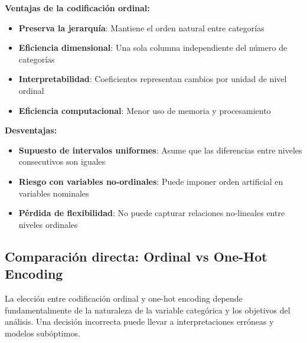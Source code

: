 \documentclass[
  letterpaper,
  DIV=11,
  numbers=noendperiod]{scrreprt}
\providecommand{\tightlist}{%
  \setlength{\itemsep}{0pt}\setlength{\parskip}{0pt}}
\begin{document}
\begin{tcolorbox}[enhanced jigsaw, breakable, toprule=.15mm, bottomtitle=1mm, coltitle=black, colbacktitle=quarto-callout-note-color!10!white, titlerule=0mm, opacitybacktitle=0.6, bottomrule=.15mm, toptitle=1mm, title=\textcolor{quarto-callout-note-color}{\faInfo}\hspace{0.5em}{Ventajas y desventajas}, arc=.35mm, rightrule=.15mm, opacityback=0, colframe=quarto-callout-note-color-frame, leftrule=.75mm, left=2mm, colback=white]

\textbf{Ventajas de la codificación ordinal:}

\begin{itemize}
\tightlist
\item
  \textbf{Preserva la jerarquía}: Mantiene el orden natural entre
  categorías
\item
  \textbf{Eficiencia dimensional}: Una sola columna independiente del
  número de categorías
\item
  \textbf{Interpretabilidad}: Coeficientes representan cambios por
  unidad de nivel ordinal
\item
  \textbf{Eficiencia computacional}: Menor uso de memoria y
  procesamiento
\end{itemize}

\textbf{Desventajas:}

\begin{itemize}
\tightlist
\item
  \textbf{Supuesto de intervalos uniformes}: Asume que las diferencias
  entre niveles consecutivos son iguales
\item
  \textbf{Riesgo con variables no-ordinales}: Puede imponer orden
  artificial en variables nominales
\item
  \textbf{Pérdida de flexibilidad}: No puede capturar relaciones
  no-lineales entre niveles ordinales
\end{itemize}

\end{tcolorbox}

\subsection{Comparación directa: Ordinal vs One-Hot
Encoding}\label{comparaciuxf3n-directa-ordinal-vs-one-hot-encoding}

La elección entre codificación ordinal y one-hot encoding depende
fundamentalmente de la naturaleza de la variable categórica y los
objetivos del análisis. Una decisión incorrecta puede llevar a
interpretaciones erróneas y modelos subóptimos.
\end{document}
